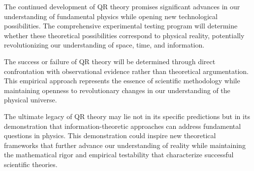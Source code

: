 The continued development of QR theory promises significant advances in our understanding of fundamental physics while opening new technological possibilities. The comprehensive experimental testing program will determine whether these theoretical possibilities correspond to physical reality, potentially revolutionizing our understanding of space, time, and information.

The success or failure of QR theory will be determined through direct confrontation with observational evidence rather than theoretical argumentation. This empirical approach represents the essence of scientific methodology while maintaining openness to revolutionary changes in our understanding of the physical universe.

The ultimate legacy of QR theory may lie not in its specific predictions but in its demonstration that information-theoretic approaches can address fundamental questions in physics. This demonstration could inspire new theoretical frameworks that further advance our understanding of reality while maintaining the mathematical rigor and empirical testability that characterize successful scientific theories.